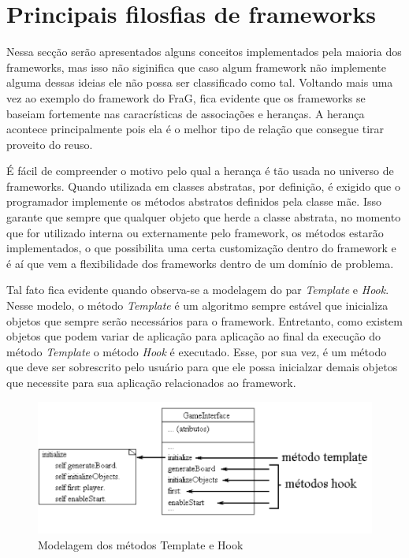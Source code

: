 \documentclass[
    12pt,       %
    openright,      %
    twoside,      %
    a4paper,      %
    english,      %
    french,       %
    spanish,      %
    brazil,       %
    ]{abntex2}
\begin{document}
      \section{Principais filosfias de frameworks}
          Nessa secção serão apresentados alguns conceitos implementados pela maioria
          dos frameworks, mas isso não siginifica que caso algum framework não implemente
          alguma dessas ideias ele não possa ser classificado como tal. Voltando mais uma
          vez ao exemplo do framework do FraG, fica evidente que os frameworks se baseiam
          fortemente nas caracrísticas de associações e heranças. A herança acontece
          principalmente pois ela é o melhor tipo de relação que consegue tirar proveito
          do reuso.

          É fácil de compreender o motivo pelo qual a herança é tão usada no universo de
          frameworks. Quando utilizada em classes abstratas, por definição, é exigido que
          o programador implemente os métodos abstratos definidos pela classe mãe. Isso
          garante que sempre que qualquer objeto que herde a classe abstrata, no momento
          que for utilizado interna ou externamente pelo framework, os métodos estarão
          implementados, o que possibilita uma certa customização dentro do framework e
          é aí que vem a flexibilidade dos frameworks dentro de um domínio de problema.

          Tal fato fica evidente quando observa-se a modelagem do par \textit{Template} e
          \textit{Hook}. Nesse modelo, o método \textit{Template} é um algoritmo sempre
          estável que inicializa objetos que sempre serão necessários para o framework.
          Entretanto, como existem objetos que podem variar de aplicação para aplicação
          ao final da execução do método \textit{Template} o método \textit{Hook} é
          executado. Esse, por sua vez, é um método que deve ser sobrescrito pelo usuário
          para que ele possa inicialzar demais objetos que necessite para sua aplicação
          relacionados ao framework.

          \begin{figure}[htbp]
              \begin{center}
                  \includegraphics[width=1.0\textwidth]{img/templateHook.png}
              \end{center}
              \caption{\label{fig:passaro}Modelagem dos métodos Template e Hook}
          \end{figure}
\end{document}
